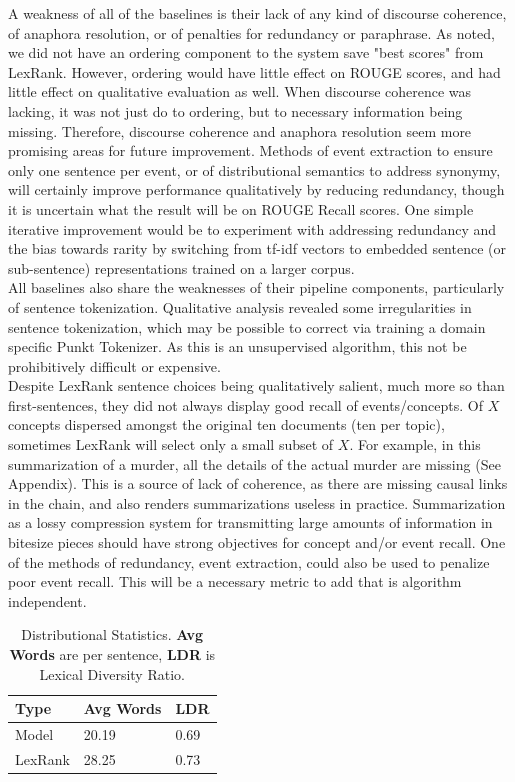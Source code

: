 \documentclass[11pt]{article}
\begin{document}
A weakness of all of the baselines is their lack of any kind of discourse coherence, of anaphora resolution, or of penalties for redundancy or paraphrase. As noted, we did not have an ordering component to the system save "best scores" from LexRank. However, ordering would have little effect on ROUGE scores, and had little effect on qualitative evaluation as well. When discourse coherence was lacking, it was not just do to ordering, but to necessary information being missing. Therefore, discourse coherence and anaphora resolution seem more promising areas for future improvement. Methods of event extraction to ensure only one sentence per event, or of distributional semantics to address synonymy, will certainly improve performance qualitatively by reducing redundancy, though it is uncertain what the result will be on ROUGE Recall scores. One simple iterative improvement would be to experiment with addressing redundancy and the bias towards rarity by switching from tf-idf vectors to embedded sentence (or sub-sentence) representations trained on a larger corpus.\\
All baselines also share the weaknesses of their pipeline components, particularly of sentence tokenization. Qualitative analysis revealed some irregularities in sentence tokenization, which may be possible to correct via training a domain specific Punkt Tokenizer. As this is an unsupervised algorithm, this not be prohibitively difficult or expensive.\\
Despite LexRank sentence choices being qualitatively salient, much more so than first-sentences, they did not always display good recall of events/concepts. Of $X$ concepts dispersed amongst the original ten documents (ten per topic), sometimes LexRank will select only a small subset of $X$. For example, in this summarization of a murder, all the details of the actual murder are missing (See Appendix). This is a source of lack of coherence, as there are missing causal links in the chain, and also renders summarizations useless in practice. Summarization as a lossy compression system for transmitting large amounts of information in bitesize pieces should have strong objectives for concept and/or event recall. One of the methods of redundancy, event extraction, could also be used to penalize poor event recall. This will be a necessary metric to add that is algorithm independent.

\begin{table}
\begin{center}
\begin{tabular}{lp{1cm}p{1cm}}
\hline \bf Type & \bf Avg Words & \bf LDR \\ \hline
Model & 20.19 & 0.69 \\
LexRank & 28.25 & 0.73 \\
\hline
\end{tabular}
\caption{\label{results-table} Distributional Statistics. \textbf{Avg Words} are per sentence, \textbf{LDR} is Lexical Diversity Ratio.}
\end{center}
\end{table}
\end{document}
